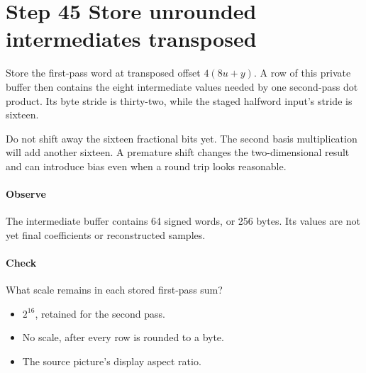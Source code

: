\section{Step 45 Store unrounded intermediates transposed}\label{h263-transform-s05}
Store the first-pass word at transposed offset $4(8u+y)$. A row of this private
buffer then contains the eight intermediate values needed by one second-pass
dot product. Its byte stride is thirty-two, while the staged halfword input's
stride is sixteen.

Do not shift away the sixteen fractional bits yet. The second basis multiplication
will add another sixteen. A premature shift changes the two-dimensional result
and can introduce bias even when a round trip looks reasonable.

\paragraph{Observe} The intermediate buffer contains 64 signed words, or 256
bytes. Its values are not yet final coefficients or reconstructed samples.
\paragraph{Check} What scale remains in each stored first-pass sum?
\begin{itemize}
  \item[A.] $2^{16}$, retained for the second pass.
  \item[B.] No scale, after every row is rounded to a byte.
  \item[C.] The source picture's display aspect ratio.
\end{itemize}
